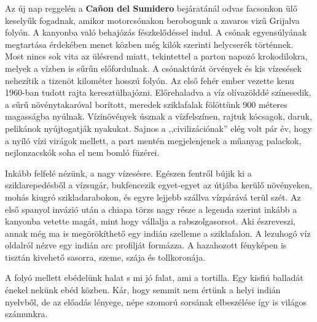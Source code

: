 Az új nap reggelén a \textbf{Cañon del Sumidero} bejáratánál odvas
facsonkon ülő keselyűk fogadnak, amikor motorcsónakon berobogunk
a zavaros vizű Grijalva folyón. A kanyonba való behajózás fészkelődéssel
indul. A csónak egyensúlyának megtartása érdekében menet
közben még kilók szerinti helycserék történnek. Most nincs sok vita
az ülésrend miatt, tekintettel a parton napozó krokodilokra, melyek
a vízben is sűrűn előfordulnak. A csónaktúrát örvények és kis vízesések
nehezítik a tizenöt kilométer hosszú folyón. Az első fehér ember
vezette kenu 1960-ban tudott rajta keresztülhajózni. Előrehaladva a
víz olívazölddé színesedik, a sűrű növénytakaróval borított, meredek
sziklafalak fölöttünk 900 méteres magasságba nyúlnak. Vízinövények
úsznak a vízfelszínen, rajtuk kócsagok, daruk, pelikánok nyújtogatják
nyakukat. Sajnos a ,,civilizációnak'' elég volt pár év, hogy a nyíló vízi
virágok mellett, a part mentén megjelenjenek a műanyag palackok,
nejlonzacskók soha el nem bomló füzérei.

Inkább felfelé nézünk, a nagy vízesésre. Egészen fentről bújik ki a
sziklarepedésből a vízsugár, bukfencezik egyet-egyet az útjába kerülő
növényeken, mohás kiugró szikladarabokon, és egyre lejjebb szállva
vízpárává terül szét. Az első spanyol invázió után a chiapa törzs nagy
része a legenda szerint inkább a kanyonba vetette magát, mint hogy
vállalja a rabszolgasorsot. Aki észreveszi, annak még ma is megörökíthető
egy indián szelleme a sziklafalon. A lezuhogó víz oldalról nézve
egy indián arc profilját formázza. A hazahozott fényképen is tisztán
kivehető sasorra, szeme, szája és tollkoronája.

A folyó mellett ebédelünk halat s mi jó falat, ami a tortilla. Egy
kisfiú balladát énekel nekünk ebéd közben. Kár, hogy semmit nem
értünk a helyi indián nyelvből, de az előadás lényege, népe szomorú
sorsának elbeszélése így is világos számunkra.

